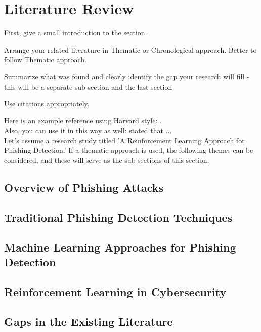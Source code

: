 \section{Literature Review}

First, give a small introduction to the section.

Arrange your related literature in Thematic or Chronological approach. Better to follow Thematic approach.

Summarize what was found and clearly identify the gap your research will fill - this will be a separate sub-section and the last section

Use citations appropriately. 

Here is an example reference using Harvard style: \citep{ref1}.\\

Also, you can use it in this way as well: \citet{ref1} stated that ...\\

Let's assume a research study titled 'A Reinforcement Learning Approach for Phishing Detection.' If a thematic approach is used, the following themes can be considered, and these will serve as the sub-sections of this section.

\subsection{Overview of Phishing Attacks}
\subsection{Traditional Phishing Detection Techniques}
\subsection{Machine Learning Approaches for Phishing Detection}
\subsection{Reinforcement Learning in Cybersecurity}
\subsection{Gaps in the Existing Literature}
